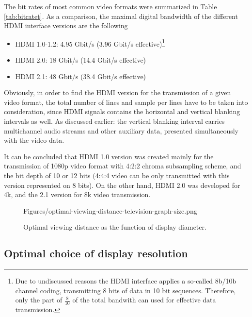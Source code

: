The bit rates of most common video formats were summarized in Table \ref{tab:bitratet}.
As a comparison, the maximal digital bandwidth of the different HDMI interface versions are the following
\begin{itemize}
\item HDMI 1.0-1.2: 4.95 Gbit/s (3.96 Gbit/s effective)\footnote{
Due to undiscussed reasons the HDMI interface applies a so-called 8b/10b channel coding, transmitting 8 bits of data in 10 bit sequences.
Therefore, only the part of $\frac{8}{10}$ of the total bandwith can used for effective data transmission.}
\item HDMI 2.0: 18 Gbit/s (14.4 Gbit/s effective)
\item HDMI 2.1: 48 Gbit/s (38.4 Gbit/s effective)
\end{itemize}
Obviously, in order to find the HDMI version for the transmission of a given video format, the total number of lines and sample per lines have to be taken into consideration, since HDMI signals contains the horizontal and vertical blanking intervals as well.
As discussed earlier: the vertical blanking interval carries multichannel audio streams and other auxiliary data, presented simultaneously with the video data.

It can be concluded that HDMI 1.0 version was created mainly for the transmission of 1080p video format with 4:2:2 chroma subsampling scheme, and the bit depth of 10 or 12 bits (4:4:4 video can be only transmitted with this version represented on 8 bits).
On the other hand, HDMI 2.0 was developed for 4k, and the 2.1 version for 8k video transmission.

\begin{figure}[]
	\centering
	\begin{overpic}[width = 0.75 \columnwidth ]{Figures/optimal-viewing-distance-television-graph-size.png}
	\small
	\end{overpic}
	\caption{Optimal viewing distance as the function of display diameter.}
	\label{Fig:optimal_vd_2}
\end{figure}

\subsection{Optimal choice of display resolution}

